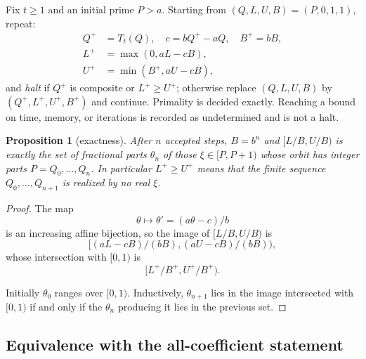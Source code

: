 \documentclass[11pt,reqno]{amsart}
\newtheorem{proposition}[theorem]{Proposition}
\theoremstyle{definition}
\theoremstyle{remark}
\begin{document}
Fix \(t\ge1\) and an initial prime \(P>a\). Starting from
\((Q,L,U,B)=(P,0,1,1)\), repeat:
\[
\begin{aligned}
Q^{+}&=T_t(Q),\quad c=bQ^{+}-aQ,\quad B^{+}=bB,\\
L^{+}&=\max(0,aL-cB),\\
U^{+}&=\min(B^{+},aU-cB),
\end{aligned}
\]
and \emph{halt} if \(Q^{+}\) is composite or \(L^{+}\ge U^{+}\); otherwise
replace \((Q,L,U,B)\) by \((Q^{+},L^{+},U^{+},B^{+})\) and continue.
Primality is decided exactly. Reaching a bound on time, memory, or
iterations is recorded as undetermined and is not a halt.

\begin{samepage}
\begin{proposition}[exactness]\leavevmode\label{thm:57}
After \(n\) accepted steps, \(B=b^n\) and
\([L/B,U/B)\) is exactly the set of fractional parts \(\theta_n\) of
those \(\xi\in[P,P+1)\) whose orbit has integer parts \(P=Q_0,\ldots,Q_n\).
In particular \(L^{+}\ge U^{+}\) means that the finite sequence
\(Q_0,\ldots,Q_{n+1}\) is realized by no real \(\xi\).
\label{thm-end:57}
\end{proposition}
\end{samepage}

\begin{proof}\leavevmode\label{proof:57}
The map
\[
\theta\mapsto\theta'=(a\theta-c)/b
\]
is an
increasing affine bijection, so the image of \([L/B,U/B)\) is
\[
[(aL-cB)/(bB),(aU-cB)/(bB)),
\]
whose intersection with \([0,1)\) is
\[
[L^{+}/B^{+},U^{+}/B^{+}).
\]

Initially \(\theta_0\) ranges over
\([0,1)\). Inductively, \(\theta_{n+1}\) lies in the image intersected
with \([0,1)\) if and only if the \(\theta_n\) producing it lies in the
previous set. \qedhere
\end{proof}

\subsection{Equivalence with the all-coefficient statement}\label{sec:C.4}
\end{document}
